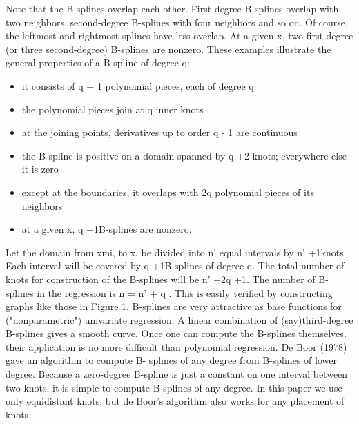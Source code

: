 \documentclass[12pt]{article}
\begin{document}
Note that the B-splines overlap each other. First-degree B-splines overlap with two neighbors, second-degree B-splines with four neighbors and so on. Of course, the leftmost and rightmost splines have less overlap. At a given x, two first-degree (or three second-degree) B-splines are nonzero.
These examples illustrate the general properties of a B-spline of degree q:
\begin{itemize}
\item it consists of q + 1 polynomial pieces, each of degree q\\
\item the polynomial pieces join at q inner knots\\
\item at the joining points, derivatives up to order q - 1 are continuous\\
\item the B-spline is positive on a domain spanned by q +2 knots; everywhere else it is zero\\
\item except at the boundaries, it overlaps with 2q polynomial pieces of its neighbors\\
\item at a given x, q +1B-splines are nonzero.
\end{itemize}

Let the domain from xmi, to x, be divided into n' equal intervals by n' +1knots. Each interval will be covered by q +1B-splines of degree q. The total number of knots for construction of the B-splines will be n' +2q +1. The number of B-splines in the regression is n = n' + q . This is easily verified by constructing graphs like those in Figure 1.
B-splines are very attractive as base functions for ("nonparametric") univariate regression. A linear combination of (say)third-degree B-splines gives a smooth curve. Once one can compute the B-splines themselves, their application is no more difficult than polynomial regression.
De Boor (1978) gave an algorithm to compute B- splines of any degree from B-splines of lower degree. Because a zero-degree B-spline is just a constant on one interval between two knots, it is simple to compute B-splines of any degree. In this paper we use only equidistant knots, but de Boor's algorithm also works for any placement of knots.
\end{document}
